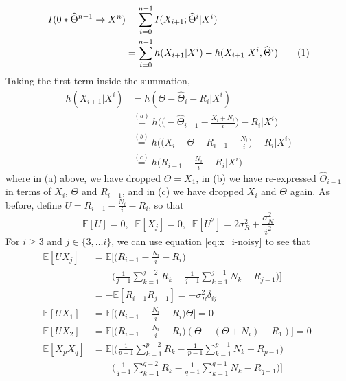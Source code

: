 \documentclass[letterpaper, 10pt, conference]{ieeeconf}
\newcommand\numberthis{\stepcounter{equation}\tag{\theequation}}
\begin{document}
\begin{align*}
	I(0*\widehat\Theta^{n-1} \rightarrow X^n) &= \sum_{i=0}^{n-1}{I(X_{i+1}; \widehat\Theta^i | X^i)} \\
											  &= \sum_{i=0}^{n-1}{h(X_{i+1} | X^i) - h(X_{i+1} | X^i, \widehat\Theta^i)} \numberthis
\end{align*}
Taking the first term inside the summation,
\begin{align*}
	h(X_{i+1} | X^i) &= h(\Theta - \widehat\Theta_i - R_i | X^i) \\
					&\overset{(a)}{=} h \bigg( \bigg( - \widehat\Theta_{i-1} - \frac{X_i + N_i}{i} \bigg) - R_i \bigg| X^i \bigg) \\
					&\overset{(b)}{=} h \bigg( \bigg( X_i - \Theta + R_{i-1} - \frac{N_i}{i} \bigg) - R_i \bigg| X^i \bigg) \\
					&\overset{(c)}{=} h \bigg( R_{i-1} - \frac{N_i}{i} - R_i \bigg| X^i \bigg)
\end{align*}
where in (a) above, we have dropped $\Theta = X_1$, in (b) we have re-expressed $\widehat\Theta_{i-1}$ in terms of $X_i$, $\Theta$ and $R_{i-1}$, and in (c) we have dropped $X_i$ and $\Theta$ again. As before, define $U = R_{i-1} - \frac{N_i}{i} - R_i$, so that
\begin{equation*}
	\mathbb{E}[U] = 0,\; \; \mathbb{E}[X_j] = 0, \; \; \mathbb{E}[U^2] = 2 \sigma_R^2 + \frac{\sigma_N^2}{i^2}
\end{equation*}
For $i \geq 3$ and $j \in \{3, \ldots i\}$, we can use equation \eqref{eq:x_i-noisy} to see that
\begin{align*}
	\mathbb{E}[U X_j] &= \mathbb{E} \bigg[ \bigg( R_{i-1} - \frac{N_i}{i} - R_i \bigg) \\
					  & \qquad             \bigg( \frac{1}{j-1} \sum_{k=1}^{j-2} R_k - \frac{1}{j-1} \sum_{k=1}^{j-1} N_k - R_{j-1} \bigg) \bigg] \\
					  &= - \mathbb{E}[R_{i-1} R_{j-1}] = - \sigma_R^2 \delta_{ij} \\
	\mathbb{E}[U X_1] &= \mathbb{E} \bigg[ \bigg( R_{i-1} - \frac{N_i}{i} - R_i \bigg) \Theta \bigg] = 0 \; \\
	\mathbb{E}[U X_2] &= \mathbb{E} \bigg[ \bigg( R_{i-1} - \frac{N_i}{i} - R_i \bigg) (\Theta - (\Theta + N_i) - R_1) \bigg] = 0 \; \\
	\mathbb{E}[X_p X_q] &= \mathbb{E} \bigg[ \bigg( \frac{1}{p-1} \sum_{k=1}^{p-2} R_k - \frac{1}{p-1} \sum_{k=1}^{p-1} N_k - R_{p-1} \bigg) \\
						& \qquad             \bigg( \frac{1}{q-1} \sum_{k=1}^{q-2} R_k - \frac{1}{q-1} \sum_{k=1}^{q-1} N_k - R_{q-1} \bigg) \bigg]
\end{align*}
\end{document}
